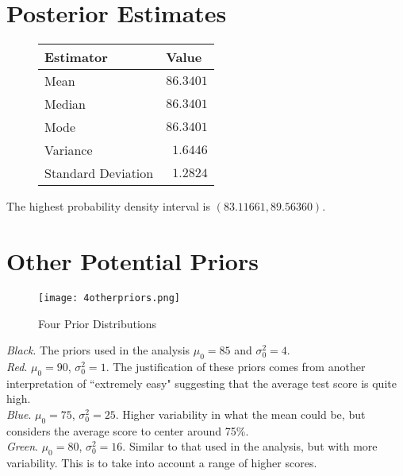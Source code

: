 \documentclass[12pt]{article}
\begin{document}
\section*{Posterior Estimates}

\begin{figure}[H]
\begin{center}
\begin{tabular}{l|r}
Estimator & \multicolumn{1}{l}{Value} \\ \hline \hline
Mean & $86.3401$ \\
Median & $86.3401$ \\
Mode & $86.3401$ \\
Variance & $1.6446$ \\
Standard Deviation & $1.2824$ \\
\end{tabular}
\end{center}
\end{figure}

\noindent The highest probability density interval is $(83.11661, 89.56360)$.


\section*{Other Potential Priors}

\begin{figure}[H]
\begin{center}
\texttt{[image: 4otherpriors.png]}
\caption{Four Prior Distributions}
\end{center}
\end{figure}

\noindent \textit{Black}.  The priors used in the analysis $\mu_0=85$ and $\sigma_0^2=4$. \\ [-0.3cm]

\noindent \textit{Red}. $\mu_0=90$, $\sigma_0^2=1$.  The justification of these priors comes from another interpretation of ``extremely easy" suggesting that the average test score is quite high. \\ [-0.3cm]

\noindent \textit{Blue}. $\mu_0=75$, $\sigma_0^2=25$.  Higher variability in what the mean could be, but considers the average score to center around 75\%. \\ [-0.3cm]

\noindent \textit{Green}. $\mu_0=80$, $\sigma_0^2=16$.  Similar to that used in the analysis, but with more variability.  This is to take into account a range of higher scores.
\end{document}
